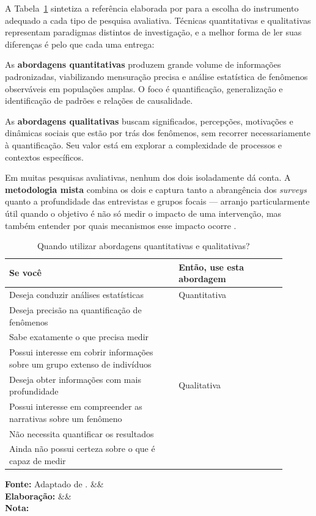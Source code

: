 \documentclass[12pt, a4paper, openany]{book}
\newcommand{\figmeta}[3]{%
  \par\vspace{4pt}%
  \begin{minipage}{\linewidth}%
  \footnotesize%
  \textbf{Fonte:} #1%
  \ifx&#2&\else\\\textbf{Elabora\c{c}\~ao:} #2\fi%
  \ifx&#3&\else\\\textbf{Nota:} #3\fi%
  \end{minipage}%
  \vspace{6pt}%
}
\begin{document}
A Tabela~\ref{tab:quando_quanti_quali} sintetiza a refer\^encia elaborada por \citet{morra2009road} para a escolha do instrumento adequado a cada tipo de pesquisa avaliativa. T\'ecnicas quantitativas e qualitativas representam paradigmas distintos de investiga\c{c}\~ao, e a melhor forma de ler suas diferen\c{c}as \'e pelo que cada uma entrega:

As \textbf{abordagens quantitativas} produzem grande volume de informa\c{c}\~oes padronizadas, viabilizando mensura\c{c}\~ao precisa e an\'alise estat\'istica de fen\^omenos observ\'aveis em popula\c{c}\~oes amplas. O foco \'e quantifica\c{c}\~ao, generaliza\c{c}\~ao e identifica\c{c}\~ao de padr\~oes e rela\c{c}\~oes de causalidade.

As \textbf{abordagens qualitativas} buscam significados, percep\c{c}\~oes, motiva\c{c}\~oes e din\^amicas sociais que est\~ao por tr\'as dos fen\^omenos, sem recorrer necessariamente \`a quantifica\c{c}\~ao. Seu valor est\'a em explorar a complexidade de processos e contextos espec\'ificos.

Em muitas pesquisas avaliativas, nenhum dos dois isoladamente d\'a conta. A \textbf{metodologia mista} \citep{creswell2014research,bryman2012social} combina os dois e captura tanto a abrang\^encia dos \textit{surveys} quanto a profundidade das entrevistas e grupos focais --- arranjo particularmente \'util quando o objetivo \'e n\~ao s\'o medir o impacto de uma interven\c{c}\~ao, mas tamb\'em entender por quais mecanismos esse impacto ocorre \citep{morra2009road}.

\begin{table}[H]
\centering
\caption{Quando utilizar abordagens quantitativas e qualitativas?}
\label{tab:quando_quanti_quali}
\begin{tabular}{p{0.55\linewidth} p{0.35\linewidth}}
\toprule
\textbf{Se voc\^e} & \textbf{Ent\~ao, use esta abordagem} \\
\midrule
Deseja conduzir an\'alises estat\'isticas & Quantitativa \\
Deseja precis\~ao na quantifica\c{c}\~ao de fen\^omenos & \\
Sabe exatamente o que precisa medir & \\
Possui interesse em cobrir informa\c{c}\~oes sobre um grupo extenso de indiv\'iduos & \\
\midrule
Deseja obter informa\c{c}\~oes com mais profundidade & Qualitativa \\
Possui interesse em compreender as narrativas sobre um fen\^omeno & \\
N\~ao necessita quantificar os resultados & \\
Ainda n\~ao possui certeza sobre o que \'e capaz de medir & \\
\bottomrule
\end{tabular}
\figmeta{Adaptado de \citet{morra2009road}.}{}{}
\end{table}
\end{document}
